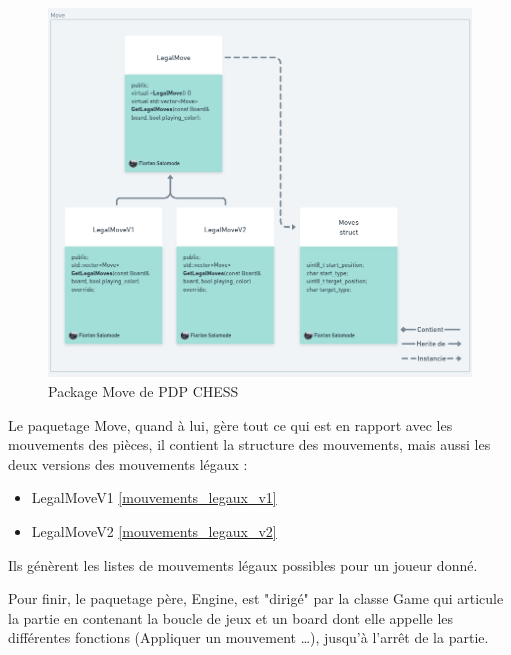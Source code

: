 \huge\documentclass{article}
\begin{document}
    \begin{figure}[!h]
        \centering
        \includegraphics[scale = 0.3]{img/Package/Move.png}
        \caption{Package Move de PDP CHESS}
        \label{pck:move}
    \end{figure}
    Le paquetage Move, quand à lui, gère tout ce qui est en rapport avec les mouvements des pièces, il contient la structure des mouvements, mais aussi les deux versions des mouvements légaux :
    \begin{itemize}
        \item LegalMoveV1 \ref{mouvements_legaux_v1}
        \item LegalMoveV2 \ref{mouvements_legaux_v2}
    \end{itemize}
    Ils génèrent les listes de mouvements légaux possibles pour un joueur donné.
    \medskip

    Pour finir, le paquetage père, Engine, est "dirigé" par la classe Game qui articule la partie en contenant la boucle de jeux et un board dont elle appelle les différentes fonctions (Appliquer un mouvement \dots), jusqu'à l'arrêt de la partie.
\end{document}

